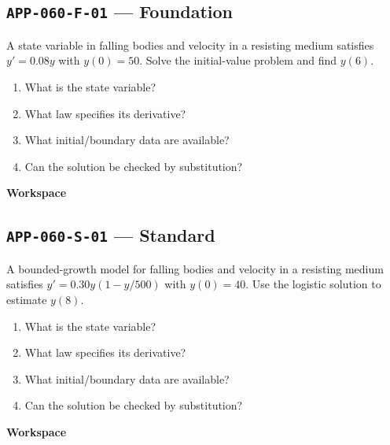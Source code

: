 \documentclass[11pt]{book}
\newcommand{\pid}[1]{\texttt{#1}}
\newcommand{\workspace}{\par\vspace{0.7in}\hrulefill\par\vspace{0.55in}\hrulefill\par}
\begin{document}
\subsection*{\pid{APP-060-F-01} — Foundation}
\begin{problembox}
A state variable in falling bodies and velocity in a resisting medium satisfies $y'=0.08y$ with $y(0)=50$. Solve the initial-value problem and find $y(6)$.
\end{problembox}
\begin{promptbox}\begin{enumerate}
\item What is the state variable?
\item What law specifies its derivative?
\item What initial/boundary data are available?
\item Can the solution be checked by substitution?
\end{enumerate}\end{promptbox}
\textbf{Workspace}\workspace
{}
\subsection*{\pid{APP-060-S-01} — Standard}
\begin{problembox}
A bounded-growth model for falling bodies and velocity in a resisting medium satisfies $y'=0.30y(1-y/500)$ with $y(0)=40$. Use the logistic solution to estimate $y(8)$.
\end{problembox}
\begin{promptbox}\begin{enumerate}
\item What is the state variable?
\item What law specifies its derivative?
\item What initial/boundary data are available?
\item Can the solution be checked by substitution?
\end{enumerate}\end{promptbox}
\textbf{Workspace}\workspace
{}
\end{document}
